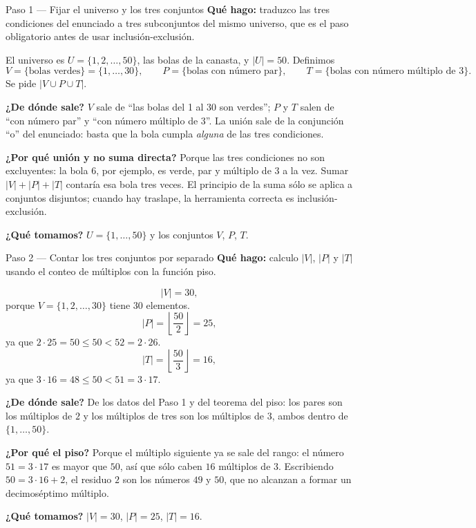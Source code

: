 \documentclass[11pt]{article}
\begin{document}
\begin{paso}{Paso 1 --- Fijar el universo y los tres conjuntos}
\textbf{Qué hago:} traduzco las tres condiciones del enunciado a tres subconjuntos del mismo universo, que es el paso obligatorio antes de usar inclusión-exclusión.

El universo es $U=\{1,2,\dots,50\}$, las bolas de la canasta, y $|U|=50$. Definimos
\[
V=\{\text{bolas verdes}\}=\{1,\dots,30\},\qquad
P=\{\text{bolas con número par}\},\qquad
T=\{\text{bolas con número múltiplo de }3\}.
\]
Se pide $|V\cup P\cup T|$.

\textbf{¿De dónde sale?} $V$ sale de ``las bolas del 1 al 30 son verdes''; $P$ y $T$ salen de ``con número par'' y ``con número múltiplo de 3''. La unión sale de la conjunción ``o'' del enunciado: basta que la bola cumpla \emph{alguna} de las tres condiciones.

\textbf{¿Por qué unión y no suma directa?} Porque las tres condiciones no son excluyentes: la bola $6$, por ejemplo, es verde, par y múltiplo de $3$ a la vez. Sumar $|V|+|P|+|T|$ contaría esa bola tres veces. El principio de la suma sólo se aplica a conjuntos disjuntos; cuando hay traslape, la herramienta correcta es inclusión-exclusión.

\textbf{¿Qué tomamos?} $U=\{1,\dots,50\}$ y los conjuntos $V$, $P$, $T$.
\end{paso}

\begin{paso}{Paso 2 --- Contar los tres conjuntos por separado}
\textbf{Qué hago:} calculo $|V|$, $|P|$ y $|T|$ usando el conteo de múltiplos con la función piso.

\[
|V| = 30 ,
\]
porque $V=\{1,2,\dots,30\}$ tiene $30$ elementos.
\[
|P| = \left\lfloor \frac{50}{2} \right\rfloor = 25 ,
\]
ya que $2\cdot 25=50\le 50 < 52 = 2\cdot 26$.
\[
|T| = \left\lfloor \frac{50}{3} \right\rfloor = 16 ,
\]
ya que $3\cdot 16 = 48 \le 50 < 51 = 3\cdot 17$.

\textbf{¿De dónde sale?} De los datos del Paso 1 y del teorema del piso: los pares son los múltiplos de $2$ y los múltiplos de tres son los múltiplos de $3$, ambos dentro de $\{1,\dots,50\}$.

\textbf{¿Por qué el piso?} Porque el múltiplo siguiente ya se sale del rango: el número $51=3\cdot 17$ es mayor que $50$, así que sólo caben $16$ múltiplos de $3$. Escribiendo $50 = 3\cdot 16 + 2$, el residuo $2$ son los números $49$ y $50$, que no alcanzan a formar un decimoséptimo múltiplo.

\textbf{¿Qué tomamos?} $|V|=30$, $|P|=25$, $|T|=16$.
\end{paso}
\end{document}
